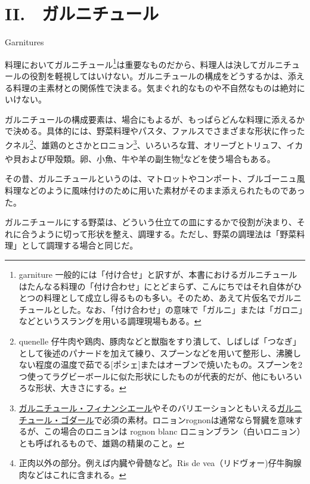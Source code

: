 \begin{main}

\hypertarget{garnitures}{%
\chapter{II.　ガルニチュール}\label{garnitures}}

\begin{frchapenv}

Garnitures

\end{frchapenv}

 

料理においてガルニチュール\footnote{garniture
  一般的には「付け合せ」と訳すが、本書におけるガルニチュールはたんなる料理の「付け合わせ」にとどまらず、こんにちではそれ自体がひとつの料理として成立し得るものも多い。そのため、あえて片仮名でガルニチュールとした。なお、「付け合わせ」の意味で「ガルニ」または「ガロニ」などというスラングを用いる調理現場もある。}は重要なものだから、料理人は決してガルニチュールの役割を軽視してはいけない。ガルニチュールの構成をどうするかは、添える料理の主素材との関係性で決まる。気まぐれ的なものや不自然なものは絶対にいけない。

ガルニチュールの構成要素は、場合にもよるが、もっぱらどんな料理に添えるかで決める。具体的には、野菜料理やパスタ、ファルスでさまざまな形状に作ったクネル\footnote{quenelle
  仔牛肉や鶏肉、豚肉などと獣脂をすり潰して、しばしば「つなぎ」として後述のパナードを加えて練り、スプーンなどを用いて整形し、沸騰しない程度の温度で茹でる{[}ポシェ{]}またはオーブンで焼いたもの。スプーンを2つ使ってラグビーボールに似た形状にしたものが代表的だが、他にもいろいろな形状、大きさにする。}、雄鶏のとさかとロニョン\footnote{\protect\hyperlink{garniture-financiere}{ガルニチュール・フィナンシエール}やそのバリエーションともいえる\protect\hyperlink{garniture-godard}{ガルニチュール・ゴダール}で必須の素材。ロニョンrognonは通常なら腎臓を意味するが、この場合のロニョンは
  rognon blanc
  ロニョンブラン（白いロニョン）とも呼ばれるもので、雄鶏の精巣のこと。}、いろいろな茸、オリーブとトリュフ、イカや貝および甲殻類。卵、小魚、牛や羊の副生物\footnote{正肉以外の部分。例えば内臓や骨髄など。Ris
  de vea（リドヴォー)仔牛胸腺肉などはこれに含まれる。}などを使う場合もある。

その昔、ガルニチュールというのは、マトロットやコンポート、ブルゴーニュ風料理などのように風味付けのために用いた素材がそのまま添えられたものであった。

ガルニチュールにする野菜は、どういう仕立ての皿にするかで役割が決まり、それに合うように切って形状を整え、調理する。ただし、野菜の調理法は「野菜料理」として調理する場合と同じだ。


\end{main}

